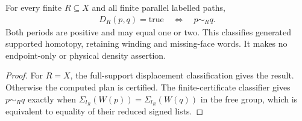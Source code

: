 \begin{lemma}
    \label{lem:peps_dual_homotopy_decision}
    \leanok
    For every finite $R\subseteq X$ and all finite parallel labelled paths,
    \begin{align}
        D_R(p,q)=\mathrm{true}\quad\Longleftrightarrow\quad p\sim_Rq.
        \label{eq:peps_dual_homotopy_decision_correct}
    \end{align}
    Both periods are positive and may equal one or two. This classifies
    generated supported homotopy, retaining winding and missing-face words.
    It makes no endpoint-only or physical density assertion.
\end{lemma}
\begin{proof}\leanok
    For $R=X$, the full-support displacement classification gives the result.
    Otherwise the computed plan is certified. The finite-certificate
    classifier gives $p\sim_Rq$ exactly when
    $\Sigma_{l_R}(W(p))=\Sigma_{l_R}(W(q))$ in the free group, which is
    equivalent to equality of their reduced signed lists.
\end{proof}
